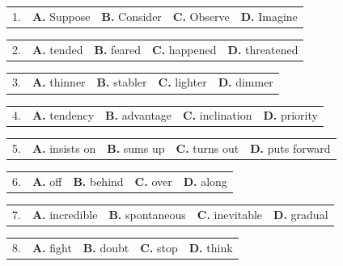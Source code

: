 \documentclass[UTF8,11pt]{ctexart}
\begin{document}
\noindent\begin{tabularx}{\linewidth}{@{}lXXXX@{}}1. & \textbf{A.} Suppose & \textbf{B.} Consider & \textbf{C.} Observe & \textbf{D.} Imagine\\\end{tabularx}\par

\noindent\begin{tabularx}{\linewidth}{@{}lXXXX@{}}2. & \textbf{A.} tended & \textbf{B.} feared & \textbf{C.} happened & \textbf{D.} threatened\\\end{tabularx}\par

\noindent\begin{tabularx}{\linewidth}{@{}lXXXX@{}}3. & \textbf{A.} thinner & \textbf{B.} stabler & \textbf{C.} lighter & \textbf{D.} dimmer\\\end{tabularx}\par

\noindent\begin{tabularx}{\linewidth}{@{}lXXXX@{}}4. & \textbf{A.} tendency & \textbf{B.} advantage & \textbf{C.} inclination & \textbf{D.} priority\\\end{tabularx}\par

\noindent\begin{tabularx}{\linewidth}{@{}lXXXX@{}}5. & \textbf{A.} insists on & \textbf{B.} sums up & \textbf{C.} turns out & \textbf{D.} puts forward\\\end{tabularx}\par

\noindent\begin{tabularx}{\linewidth}{@{}lXXXX@{}}6. & \textbf{A.} off & \textbf{B.} behind & \textbf{C.} over & \textbf{D.} along\\\end{tabularx}\par

\noindent\begin{tabularx}{\linewidth}{@{}lXXXX@{}}7. & \textbf{A.} incredible & \textbf{B.} spontaneous & \textbf{C.} inevitable & \textbf{D.} gradual\\\end{tabularx}\par

\noindent\begin{tabularx}{\linewidth}{@{}lXXXX@{}}8. & \textbf{A.} fight & \textbf{B.} doubt & \textbf{C.} stop & \textbf{D.} think\\\end{tabularx}\par
\end{document}
